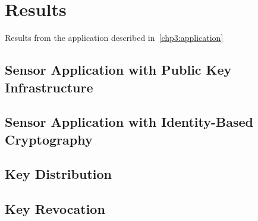 \chapter{Results}
Results from the application described in~\autoref{chp3:application}

\section{Sensor Application with Public Key Infrastructure}

\section{Sensor Application with Identity-Based Cryptography}

\section{Key Distribution}

\section{Key Revocation}